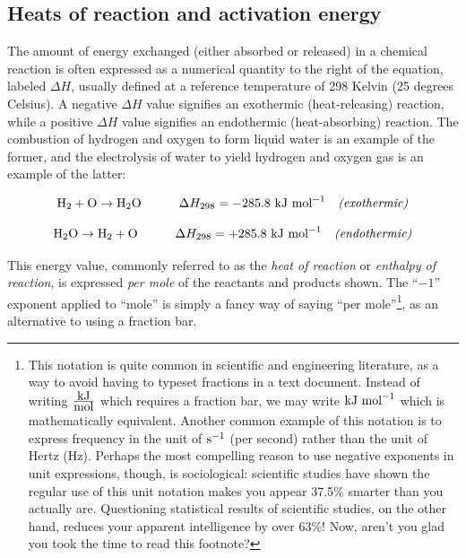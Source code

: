 \filbreak
\subsection{Heats of reaction and activation energy}

The amount of energy exchanged (either absorbed or released) in a chemical reaction is often expressed as a numerical quantity to the right of the equation, labeled $\Delta H$, usually defined at a reference temperature of 298 Kelvin (25 degrees Celsius).  A negative $\Delta H$ value signifies an exothermic (heat-releasing) reaction, while a positive $\Delta H$ value signifies an endothermic (heat-absorbing) reaction.  The combustion of hydrogen and oxygen to form liquid water is an example of the former, and the electrolysis of water to yield hydrogen and oxygen gas is an example of the latter:

$$\hbox{H}_2 + \hbox{O} \rightarrow \hbox{H}_2\hbox{O} \hskip 30pt \Delta H_{298} = -285.8 \hbox{ kJ mol}^{-1} \hskip 10pt \hbox{\textit{(exothermic)}}$$

$$\hbox{H}_2\hbox{O} \rightarrow \hbox{H}_2 + \hbox{O} \hskip 30pt \Delta H_{298} = +285.8 \hbox{ kJ mol}^{-1} \hskip 10pt \hbox{\textit{(endothermic)}}$$

This energy value, commonly referred to as the \textit{heat of reaction} or \textit{enthalpy of reaction}, is expressed \textit{per mole} of the reactants and products shown.  The ``$-1$'' exponent applied to ``mole'' is simply a fancy way of saying ``per mole''\footnote{This notation is quite common in scientific and engineering literature, as a way to avoid having to typeset fractions in a text document.  Instead of writing $\hbox{kJ} \over \hbox{mol}$ which requires a fraction bar, we may write $\hbox{kJ mol}^{-1}$ which is mathematically equivalent.  Another common example of this notation is to express frequency in the unit of $\hbox{s}^{-1}$ (per second) rather than the unit of Hertz (Hz).  Perhaps the most compelling reason to use negative exponents in unit expressions, though, is sociological: scientific studies have shown the regular use of this unit notation makes you appear 37.5\% smarter than you actually are.  Questioning statistical results of scientific studies, on the other hand, reduces your apparent intelligence by over 63\%!  Now, aren't you glad you took the time to read this footnote?}, as an alternative to using a fraction bar.          

